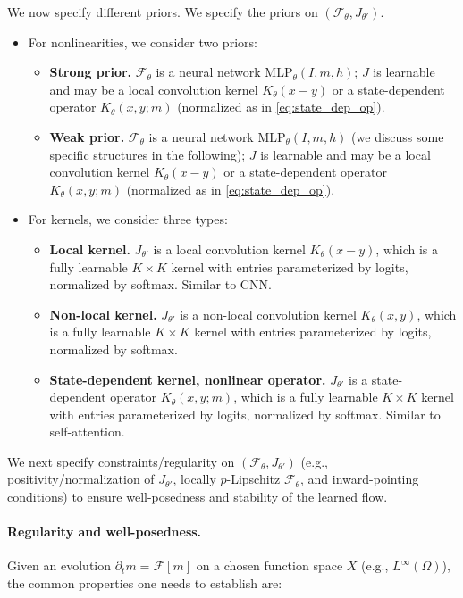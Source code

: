 \documentclass[11pt,a4paper]{article}
\theoremstyle{plain}
\theoremstyle{definition}
\theoremstyle{remark}
\begin{document}
We now specify different priors. We specify the priors on $(\mathcal{F}_\theta,J_{\theta\prime})$.
\begin{itemize}
	\item For nonlinearities, we consider two priors:
	      \begin{itemize}
		      \item \textbf{Strong prior.} $\mathcal{F}_\theta$ is a neural network $\mathrm{MLP}_\theta(I,m,h)$; $J$ is learnable and may be a local convolution kernel $K_\theta(x-y)$ or a state-dependent operator $K_\theta(x,y; m)$ (normalized as in \eqref{eq:state_dep_op}).
		      \item \textbf{Weak prior.} $\mathcal{F}_\theta$ is a neural network $\mathrm{MLP}_\theta(I,m,h)$ (we discuss some specific structures in the following); $J$ is learnable and may be a local convolution kernel $K_\theta(x-y)$ or a state-dependent operator $K_\theta(x,y; m)$ (normalized as in \eqref{eq:state_dep_op}).
	      \end{itemize}
	\item For kernels, we consider three types:
	      \begin{itemize}
		      \item \textbf{Local kernel.} $J_{\theta\prime}$ is a local convolution kernel $K_\theta(x-y)$, which is a fully learnable $K\times K$ kernel with entries parameterized by logits, normalized by softmax. Similar to CNN.
		      \item \textbf{Non-local kernel.} $J_{\theta\prime}$ is a non-local convolution kernel $K_\theta(x,y)$, which is a fully learnable $K\times K$ kernel with entries parameterized by logits, normalized by softmax.
		      \item \textbf{State-dependent kernel, nonlinear operator.} $J_{\theta\prime}$ is a state-dependent operator $K_\theta(x,y; m)$, which is a fully learnable $K\times K$ kernel with entries parameterized by logits, normalized by softmax. Similar to self-attention.
	      \end{itemize}
\end{itemize}


We next specify constraints/regularity on $(\mathcal{F}_\theta,J_{\theta\prime})$ (e.g., positivity/normalization of $J_{\theta\prime}$, locally $p$-Lipschitz $\mathcal{F}_\theta$, and inward-pointing conditions) to ensure well-posedness and stability of the learned flow.


\paragraph{Regularity and well-posedness.}
Given an evolution $\partial_t m = \mathcal{F}[m]$ on a chosen function space $X$ (e.g., $L^\infty(\Omega)$), the common properties one needs to establish are:
\end{document}
